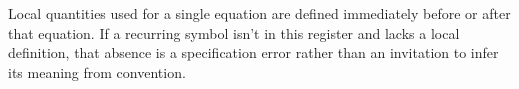 Local quantities used for a single equation are defined immediately before or
after that equation. If a recurring symbol isn't in this register and lacks a
local definition, that absence is a specification error rather than an
invitation to infer its meaning from convention.
